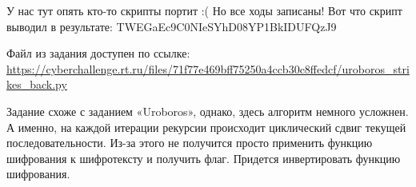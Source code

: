 
У нас тут опять кто-то скрипты портит :( Но все ходы записаны! Вот что скрипт выводил в результате: TWEGaEc9C0NIeSYhD08YP1BkIDUFQzJ9

Файл из задания доступен по ссылке: \url{https://cyberchallenge.rt.ru/files/71f77e469bff75250a4ccb30c8ffedcf/uroboros_strikes_back.py}

\solutionSection

Задание схоже с заданием «Uroboros», однако, здесь алгоритм немного усложнен. А именно, на каждой итерации рекурсии происходит циклический сдвиг текущей последовательности. Из-за этого не получится просто применить функцию шифрования к шифротексту и получить флаг. Придется инвертировать функцию шифрования.

